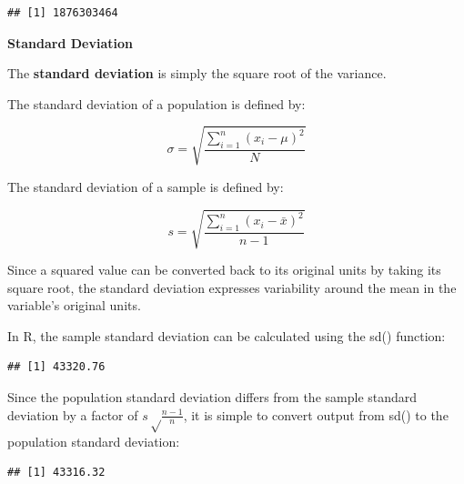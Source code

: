 \documentclass[]{book}
\newenvironment{Shaded}{\begin{snugshade}}{\end{snugshade}}
\newcommand{\CommentTok}[1]{\textcolor[rgb]{0.56,0.35,0.01}{\textit{#1}}}
\newcommand{\DecValTok}[1]{\textcolor[rgb]{0.00,0.00,0.81}{#1}}
\newcommand{\KeywordTok}[1]{\textcolor[rgb]{0.13,0.29,0.53}{\textbf{#1}}}
\newcommand{\NormalTok}[1]{#1}
\newcommand{\OperatorTok}[1]{\textcolor[rgb]{0.81,0.36,0.00}{\textbf{#1}}}
\newcommand{\StringTok}[1]{\textcolor[rgb]{0.31,0.60,0.02}{#1}}
\begin{document}
\begin{verbatim}
## [1] 1876303464
\end{verbatim}

\textbf{Standard Deviation}

The \textbf{standard deviation} is simply the square root of the variance.

The standard deviation of a population is defined by:

\[ \sigma = \sqrt{\frac{\displaystyle\sum_{i=1}^{n} (x_{i} - \mu)^{2}}{N}} \]

The standard deviation of a sample is defined by:

\[ s = \sqrt{\frac{\displaystyle\sum_{i=1}^{n} (x_{i} - \bar{x})^{2}}{n - 1}} \]

Since a squared value can be converted back to its original units by taking its square root, the standard deviation expresses variability around the mean in the variable's original units.

In R, the sample standard deviation can be calculated using the sd() function:

\begin{Shaded}
\end{Shaded}

\begin{verbatim}
## [1] 43320.76
\end{verbatim}

Since the population standard deviation differs from the sample standard deviation by a factor of \(s \sqrt \frac{n - 1}{n}\), it is simple to convert output from sd() to the population standard deviation:

\begin{Shaded}
\end{Shaded}

\begin{verbatim}
## [1] 43316.32
\end{verbatim}
\end{document}
